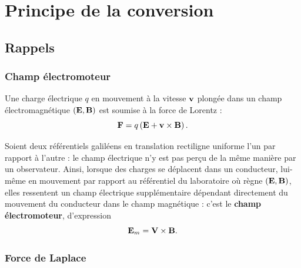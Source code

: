 \documentclass[11pt,a4paper]{report}
\begin{document}

\newpage
\section{Principe de la conversion}\label{sec:1}

\subsection{Rappels}

\subsubsection{Champ électromoteur}
Une charge électrique $q$ en mouvement à la vitesse $\bold{v}$ plongée dans un champ électromagnétique $(\bold{E},\bold{B})$ est soumise à la force de Lorentz :
\begin{equation}
	\bold{F} = q\left(\bold{E} + \bold{v}\times\bold{B} \right).\\
\end{equation}

Soient deux référentiels galiléens en translation rectiligne uniforme l'un par rapport à l'autre : le champ électrique n'y est pas perçu de la même manière par un observateur. Ainsi, lorsque des charges se déplacent dans un conducteur, lui-même en mouvement par rapport au référentiel du laboratoire où règne $(\bold{E},\bold{B})$, elles ressentent un champ électrique supplémentaire dépendant directement du mouvement du conducteur dans le champ magnétique : c'est le \textbf{champ électromoteur}, d'expression
\begin{equation}
	\bold{E}_m = \bold{V}\times\bold{B}.
\end{equation}

\subsubsection{Force de Laplace}
\end{document}
